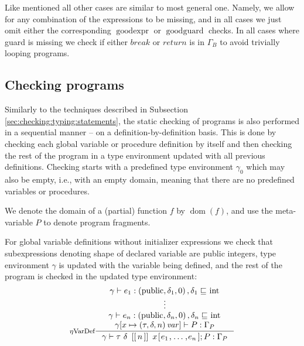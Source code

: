 \documentclass[a4paper, 10pt, draft]{report}
\newcommand{\mycode}[1]{\ensuremath{\mbox{\lstinline{#1}}}}
\begin{document}
Like mentioned all other cases are similar to most general one. Namely, we
allow for any combination of the expressions to be missing, and in all cases we
just omit either the corresponding $\operatorname{goodexpr}$ or
$\operatorname{goodguard}$ checks. In all cases where guard is missing we check
if either $break$ or $return$ is in $\Gamma_B$ to avoid trivially looping
programs.

\subsection{Checking programs}\label{sec:checking:typing:programs}

Similarly to the techniques described in Subsection
\ref{sec:checking:typing:statements}, the static checking of programs is also
performed in a sequential manner -- on a definition-by-definition basis. This
is done by checking each global variable or procedure definition by itself and
then checking the rest of the program in a type environment updated with all
previous definitions. Checking starts with a predefined type environment
$\gamma_0$ which may also be empty, i.e., with an empty domain, meaning that
there are no predefined variables or procedures.

We denote the domain of a (partial) function $f$ by
$\operatorname{dom}\!\left(f\right)$, and use the meta-variable $P$ to denote
program fragments. 

For global variable definitions without initializer expressions we check that
subexpressions denoting shape of declared variable are public integers,
type environment $\gamma$ is updated with the variable being defined, and the
rest of the program is checked in the updated type environment:
\[ \inference[$\eta$VarDef]{
  \gamma |- e_1 : \left( \mycode{public}, \delta_1, 0 \right), \delta_1 \sqsubseteq \mycode{int} \\
  \vdots \\
  \gamma |- e_n : \left( \mycode{public}, \delta_n, 0 \right), \delta_n \sqsubseteq \mycode{int} \\
  \gamma[x \mapsto \left( \tau, \delta, n \right) \mathit{var}] |- P : \Gamma_P
}{
  \gamma |- \tau\ \delta\ \mycode{[[}n\mycode{]]}\ x\mycode{[} e_1 \mycode{,} \ldots \mycode{,} e_n  \mycode{];} P : \Gamma_P
} \]
\end{document}
